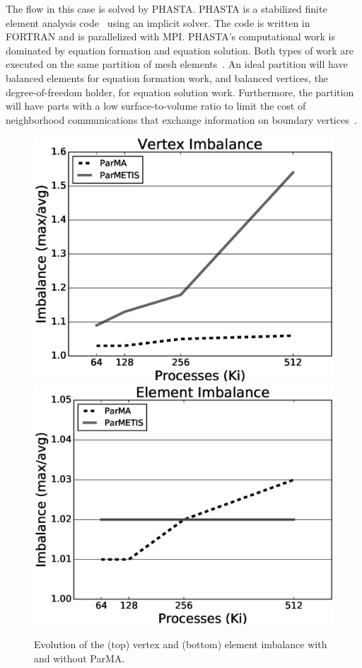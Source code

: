 The flow in this case is solved by PHASTA.
PHASTA is a stabilized finite element analysis code~\cite{WhiJan01} using
an implicit solver.
The code is written in FORTRAN and is parallelized with MPI.
PHASTA's computational work is dominated by equation formation and equation solution.
Both types of work are executed on the same partition of mesh
elements~\cite{sahni2009scalable}.
An ideal partition will have balanced elements for equation formation work,
and balanced vertices, the degree-of-freedom holder, for equation solution work.
Furthermore, the partition will have parts with a low surface-to-volume ratio to
limit the cost of neighborhood communications that exchange information on
boundary vertices~\cite{rasquinCise2014}.

\begin{figure} \centering
  \includegraphics[width=.6\textwidth]{results/phasta/1B/vtxImb.eps}
  \includegraphics[width=.6\textwidth]{results/phasta/1B/elmImb.eps}
  \caption{Evolution of the (top) vertex and (bottom) element
    imbalance with and without ParMA.
  }
  \label{fig:ParmaBal}
\end{figure}

